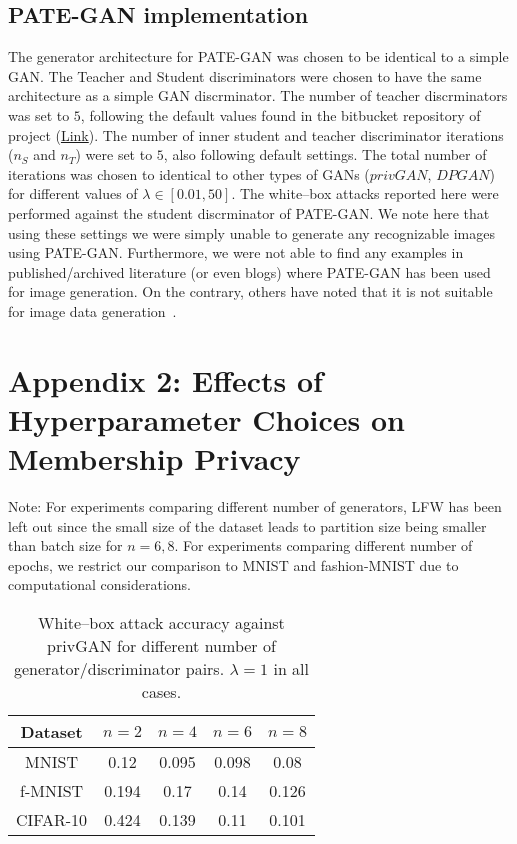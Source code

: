 \documentclass{article}
\begin{document}
\subsection*{PATE-GAN implementation}
The generator architecture for PATE-GAN was chosen to be identical to a simple GAN. The Teacher and Student discriminators were chosen to have the same architecture as a simple GAN discrminator. The number of teacher discrminators was set to $5$, following the default values found in the bitbucket repository of project (\href{https://bitbucket.org/mvdschaar/mlforhealthlabpub/src/40de054cab8f945fd0a7e6846d53605c0bcc058e/alg/pategan/}{Link}). The number of inner student and teacher discriminator iterations ($n_S$ and $n_T$) were set to $5$, also following default settings. The total number of iterations was chosen to identical to other types of GANs ($privGAN$, $DPGAN$) for different values of $\lambda \in [0.01,50]$. The white--box attacks reported here were performed against the student discrminator of PATE-GAN. We note here that using these settings we were simply unable to generate any recognizable images using PATE-GAN. Furthermore, we were not able to find any examples in published/archived literature (or even blogs) where PATE-GAN has been used for image generation. On the contrary, others have noted that it is not suitable for image data generation~\cite{fan2020survey}. 





\section*{Appendix 2: Effects of Hyperparameter Choices on Membership Privacy}
Note: For experiments comparing different number of generators, LFW has been left out since the small size of the dataset leads to partition size being smaller than batch size for $n=6,8$. For experiments comparing different number of epochs, we restrict our comparison to MNIST and fashion-MNIST due to computational considerations. 

\begin{table}[h!]
\small
\begin{center}
\begin{tabular}{ c|c|c|c|c } 
 \hline
 Dataset & $n=2$ & $n=4$ & $n=6$ & $n=8$
 \\ \hline
 MNIST  & 0.12 & 0.095 &0.098 & 0.08\\ 
 f-MNIST  & 0.194 & 0.17 & 0.14 & 0.126\\
 CIFAR-10 & 0.424 & 0.139 & 0.11 & 0.101\\
 \hline
\end{tabular}
\end{center}
 \caption{White--box attack accuracy against privGAN for different number of generator/discriminator pairs. $\lambda=1$ in all cases.}
 \label{SuppTable4}
\end{table}
\end{document}

